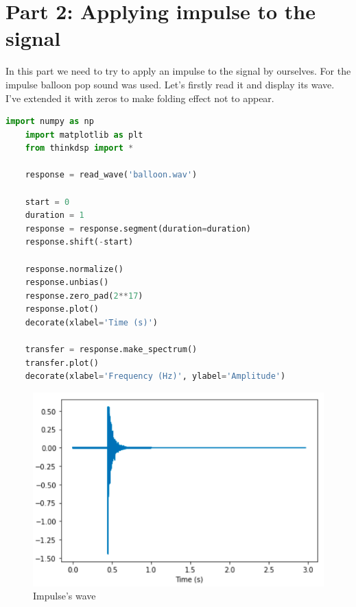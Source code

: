 \documentclass[a4paper]{article}
\begin{document}
    \newpage
        \section{Part 2: Applying impulse to the signal}

        In this part we need to try to apply an impulse to the signal by ourselves. For the impulse balloon pop sound was used. Let's firstly read it and display its wave. I've extended it with zeros to make folding effect not to appear.
        
        \begin{lstlisting}[language=Python,caption=Reading the impulse,label={lst:part1_2}]
    import numpy as np
    import matplotlib as plt
    from thinkdsp import *
    
    response = read_wave('balloon.wav')
    
    start = 0
    duration = 1
    response = response.segment(duration=duration)
    response.shift(-start)
    
    response.normalize()
    response.unbias()
    response.zero_pad(2**17)
    response.plot()
    decorate(xlabel='Time (s)')
    
    transfer = response.make_spectrum()
    transfer.plot()
    decorate(xlabel='Frequency (Hz)', ylabel='Amplitude')
        \end{lstlisting}
        
        \begin{figure}[H]
            \centering
            \includegraphics[width=\textwidth]{img/p2_1.png}
            \caption{Impulse's wave}
            \label{fig:part1_1_2}
        \end{figure}
        
\end{document}
